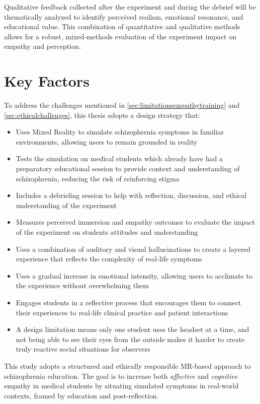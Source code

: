 Qualitative feedback collected after the experiment and during the debrief will be thematically analyzed to identify perceived realism, emotional resonance, and educational value. This combination of quantitative and qualitative methods allows for a robust, mixed-methods evaluation of the experiment impact on empathy and perception.


\section{Key Factors}
To address the challenges mentioned in \ref{sec:limitationsempathytraining} and \ref{sec:ethicalchallenges}, this thesis adopts a design strategy that:

\begin{itemize}
    \item Uses Mixed Reality to simulate schizophrenia symptoms in familiar environments, allowing users to remain grounded in reality
    \item Tests the simulation on medical students which already have had a preparatory educational session to provide context and understanding of schizophrenia, reducing the risk of reinforcing stigma
    \item Includes a debriefing session to help with reflection, discussion, and ethical understanding of the experiment
    \item Measures perceived immersion and empathy outcomes to evaluate the impact of the experiment on students attitudes and understanding
    \item Uses a combination of auditory and visual hallucinations to create a layered experience that reflects the complexity of real-life symptoms
    \item Uses a gradual increase in emotional intensity, allowing users to acclimate to the experience without overwhelming them
    \item Engages students in a reflective process that encourages them to connect their experiences to real-life clinical practice and patient interactions
    \item A design limitation means only one student uses the headset at a time, and not being able to see their eyes from the outside makes it harder to create truly reactive social situations for observers
\end{itemize}

This study adopts a structured and ethically responsible MR-based approach to schizophrenia education. The goal is to increase both \textit{affective} and \textit{cognitive} empathy in medical students by situating simulated symptoms in real-world contexts, framed by education and post-reflection. 

